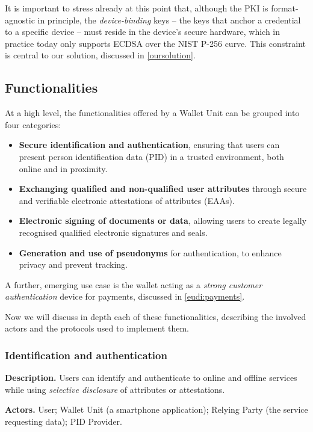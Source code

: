 \documentclass{article}
\begin{document}
It is important to stress already at this point that, although the PKI is format-agnostic in principle, the
\emph{device-binding} keys -- the keys that anchor a credential to a specific device -- must reside in the device's
secure hardware, which in practice today only supports ECDSA over the NIST P-256 curve. This constraint is central to
our solution, discussed in \cref{oursolution}.

\subsection{Functionalities}
\label{eudi:functionalities}
At a high level, the functionalities offered by a Wallet Unit can be grouped into four categories:
\begin{itemize}[noitemsep]
  \item \textbf{Secure identification and authentication}, ensuring that users can present person identification data
        (PID) in a trusted environment, both online and in proximity.
  \item \textbf{Exchanging qualified and non-qualified user attributes} through secure and verifiable electronic
        attestations of attributes (EAAs).
  \item \textbf{Electronic signing of documents or data}, allowing users to create legally recognised qualified
        electronic signatures and seals.
  \item \textbf{Generation and use of pseudonyms} for authentication, to enhance privacy and prevent tracking.
\end{itemize}
A further, emerging use case is the wallet acting as a \emph{strong customer authentication} device for payments,
discussed in \cref{eudi:payments}.

Now we will discuss in depth each of these functionalities, describing the involved actors and the protocols used to implement them.

\subsubsection{Identification and authentication}
\label{eudi:auth}
\textbf{Description.} Users can identify and authenticate to online and offline services while using
\emph{selective disclosure} of attributes or attestations.

\textbf{Actors.} User; Wallet Unit (a smartphone application); Relying Party (the service requesting data); PID Provider.
\end{document}
